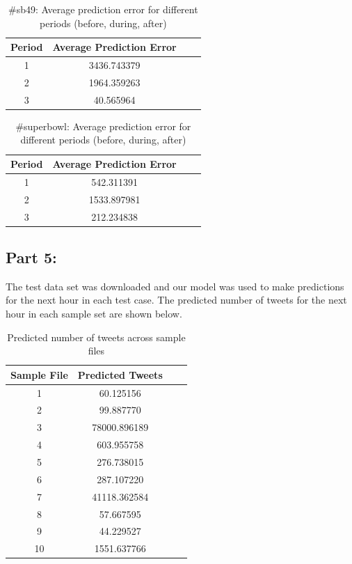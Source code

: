 \documentclass[12pt]{article}
\begin{document}
\begin{table}[H]
	\centering
	\begin{tabular}{| c | c | c | c |}
		\hline 
		Period & Average Prediction Error \\\hline
		1 & 3436.743379 \\\hline
		2 & 1964.359263 \\\hline 
		3 & 40.565964 \\\hline
	\end{tabular} 
	\caption{\#sb49: Average prediction error for different periods (before, during, after)}
	\label{part1:tab1}
\end{table} 


\begin{table}[H]
	\centering
	\begin{tabular}{| c | c | c | c |}
		\hline 
		Period & Average Prediction Error \\\hline
		1 & 542.311391 \\\hline
		2 & 1533.897981 \\\hline 
		3 & 212.234838 \\\hline
	\end{tabular} 
	\caption{\#superbowl: Average prediction error for different periods (before, during, after)}
	\label{part1:tab1}
\end{table} 

\subsection{Part 5:}

The test data set was downloaded and our model was used to make predictions for the next hour in each test case. The predicted number of tweets for the next hour in each sample set are shown below.

\begin{table}[H]
	\centering
	\begin{tabular}{| c | c | c | c |}
		\hline 
		Sample File & Predicted Tweets \\\hline
		1 & 60.125156 \\\hline
		2 & 99.887770 \\\hline 
		3 & 78000.896189 \\\hline
		4 & 603.955758 \\\hline
		5 & 276.738015 \\\hline
		6 & 287.107220 \\\hline
		7 & 41118.362584 \\\hline
		8 & 57.667595 \\\hline
		9 & 44.229527 \\\hline
		10 & 1551.637766 \\\hline
	\end{tabular} 
	\caption{Predicted number of tweets across sample files}
	\label{part1:tab1}
\end{table} 
\end{document}
